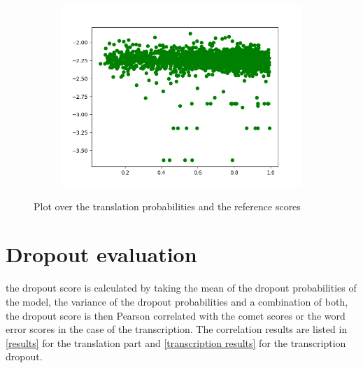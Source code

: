 \begin{figure}[h]
\begin{subfigure}{0.4\linewidth}
    \end{subfigure}
    \begin{subfigure}{0.4\linewidth}
        \includegraphics[width=\textwidth]{Latex/sections/images/seamlessentropy.png}
    \end{subfigure}
    
    \caption{Plot over the translation probabilities and the reference scores}
    \label{fig:translationeval scatter plot}
\end{figure}


\section{Dropout evaluation}
the dropout score is calculated by taking the mean of the dropout probabilities of the model, the variance of the dropout probabilities and a combination of both, the dropout score is then Pearson correlated with the comet scores or the word error scores in the case of the transcription. 
The correlation results are listed in \ref{results} for the translation part and \ref{transcription results} for the transcription dropout. 

